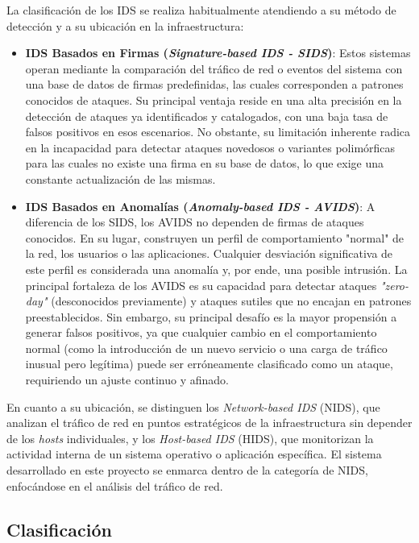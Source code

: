 La clasificación de los IDS se realiza habitualmente atendiendo a su método de detección y a su ubicación en la infraestructura:
\begin{itemize}
    
    \item\textbf{IDS Basados en Firmas (\textit{Signature-based IDS - SIDS})}: Estos sistemas operan mediante la comparación del tráfico de red o eventos del sistema con una base de datos de firmas predefinidas, las cuales corresponden a patrones conocidos de ataques. Su principal ventaja reside en una alta precisión en la detección de ataques ya identificados y catalogados, con una baja tasa de falsos positivos en esos escenarios. No obstante, su limitación inherente radica en la incapacidad para detectar ataques novedosos o variantes polimórficas para las cuales no existe una firma en su base de datos, lo que exige una constante actualización de las mismas.
    
    \item\textbf{IDS Basados en Anomalías (\textit{Anomaly-based IDS - AVIDS})}: A diferencia de los SIDS, los AVIDS no dependen de firmas de ataques conocidos. En su lugar, construyen un perfil de comportamiento "normal" de la red, los usuarios o las aplicaciones. Cualquier desviación significativa de este perfil es considerada una anomalía y, por ende, una posible intrusión. La principal fortaleza de los AVIDS es su capacidad para detectar ataques \textit{"zero-day"}  (desconocidos previamente) y ataques sutiles que no encajan en patrones preestablecidos. Sin embargo, su principal desafío es la mayor propensión a generar falsos positivos, ya que cualquier cambio en el comportamiento normal (como la introducción de un nuevo servicio o una carga de tráfico inusual pero legítima) puede ser erróneamente clasificado como un ataque, requiriendo un ajuste continuo y afinado.
    
\end{itemize}

En cuanto a su ubicación, se distinguen los \textit{Network-based IDS} (NIDS), que analizan el tráfico de red en puntos estratégicos de la infraestructura sin depender de los \textit{hosts} individuales, y los \textit{Host-based IDS} (HIDS), que monitorizan la actividad interna de un sistema operativo o aplicación específica. El sistema desarrollado en este proyecto se enmarca dentro de la categoría de NIDS, enfocándose en el análisis del tráfico de red.

\subsection{Clasificación}

